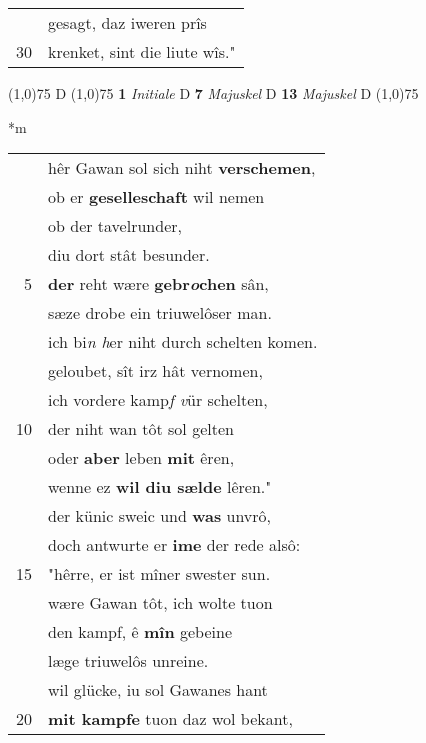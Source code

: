 \documentclass[8pt,a4paper,notitlepage]{article}
\begin{document}
\begin{table}[ht]
\begin{minipage}[t]{0.5\linewidth}
\begin{tabular}{rl}
 & gesagt, daz iweren prîs\\ 
30 & krenket, sint die liute wîs."\\ 
\end{tabular}
\scriptsize
\line(1,0){75} \newline
D \newline
\line(1,0){75} \newline
\textbf{1} \textit{Initiale} D  \textbf{7} \textit{Majuskel} D  \textbf{13} \textit{Majuskel} D  \newline
\line(1,0){75} \newline
\newline
\end{minipage}
\hspace{0.5cm}
\begin{minipage}[t]{0.5\linewidth}
\small
\begin{center}*m
\end{center}
\begin{tabular}{rl}
 & hêr Gawan sol sich niht \textbf{verschemen},\\ 
 & ob er \textbf{geselleschaft} wil nemen\\ 
 & ob der tavelrunder,\\ 
 & diu dort stât besunder.\\ 
5 & \textbf{der} reht wære \textbf{gebr\textit{o}chen} sân,\\ 
 & sæze drobe ein triuwelôser man.\\ 
 & ich bi\textit{n h}er niht durch schelten komen.\\ 
 & geloubet, sît irz hât vernomen,\\ 
 & ich vordere kamp\textit{f v}ür schelten,\\ 
10 & der niht wan tôt sol gelten\\ 
 & oder \textbf{aber} leben \textbf{mit} êren,\\ 
 & wenne ez \textbf{wil diu sælde} lêren."\\ 
 & der künic sweic und \textbf{was} unvrô,\\ 
 & doch antwurte er \textbf{ime} der rede alsô:\\ 
15 & "hêrre, er ist mîner swester sun.\\ 
 & wære Gawan tôt, ich wolte tuon\\ 
 & den kampf, ê \textbf{mîn} gebeine\\ 
 & læge triuwelôs unreine.\\ 
 & wil glücke, iu sol Gawanes hant\\ 
20 & \textbf{mit kampfe} tuon daz wol bekant,\\ 

\end{tabular}
\end{minipage}
\end{table}
\end{document}
